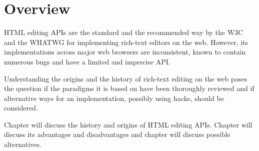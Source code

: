 \chapter{Overview}





HTML editing APIs are the standard and the recommended way by the W3C and the WHATWG for implementing rich-text editors on the web. However, its implementations across major web browsers are inconsistent, known to contain numerous bugs and have a limited and imprecise API.

Understanding the origins and the history of rich-text editing on the web poses the question if the paradigms it is based on have been thoroughly reviewed and if alternative ways for an implementation, possibly using hacks, should be considered.

Chapter  will discuss the history and origins of HTML editing APIs. Chapter  will discuss its advantages and disadvantages and
chapter  will discuss possible alternatives.






